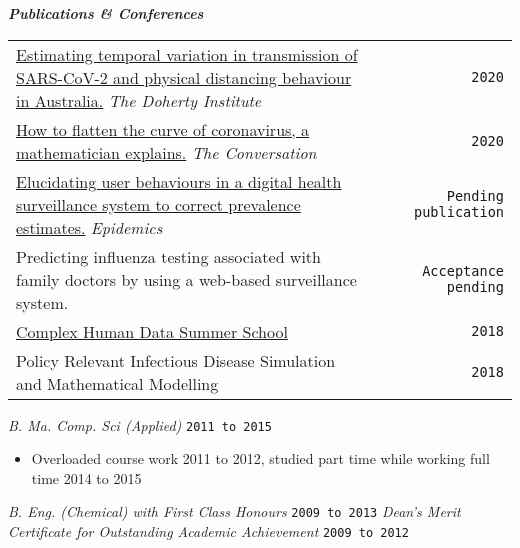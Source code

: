 \documentclass{article}
\begin{document}
\textbf{\emph{Publications \& Conferences}}
\begin{table}[h!] \small
\begin{tabular}{ p{12.1cm} c r}

\href{https://www.doherty.edu.au/uploads/content_doc/Technical_report_4_update_29July2020.pdf"}{
        Estimating temporal variation in transmission of SARS-CoV-2 and physical distancing behaviour in Australia.} \emph{The Doherty Institute} && \texttt{2020}\\

\href{https://theconversation.com/how-to-flatten-the-curve-of-coronavirus-a-mathematician-explains-133514}{How to flatten the curve of coronavirus, a mathematician explains.} \emph{The Conversation} & & \texttt{2020} \\
	
 \href{https://www.medrxiv.org/content/10.1101/19003715v2}{Elucidating user behaviours in a digital health surveillance system to correct prevalence estimates.} \emph{Epidemics} & & \texttt{Pending publication} \\

 Predicting influenza testing associated with family doctors by using a web-based surveillance system. & & \texttt{Acceptance pending} \\

 \href{https://chdsummerschool.com/}{Complex Human Data Summer School} & & \texttt{2018} \\
 Policy Relevant Infectious Disease Simulation and Mathematical Modelling& & \texttt{2018} \\

\end{tabular}
\end{table}


\emph{B. Ma. Comp. Sci (Applied)} \hfill  \texttt{2011 to 2015}

{\footnotesize
\begin{itemize}
\item Overloaded course work 2011 to 2012, studied part time while working full time 2014 to 2015
\end{itemize} }

\emph{B. Eng. (Chemical) with First Class Honours} \hfill \texttt{2009 to 2013}
\emph{Dean's Merit Certificate for Outstanding Academic Achievement} \hfill \texttt{2009 to 2012}
\\


\end{document}
